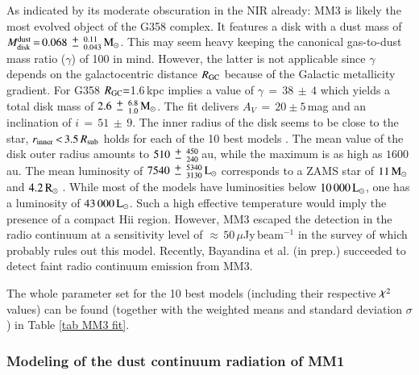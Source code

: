As indicated by its moderate obscuration in the NIR
already: MM3 is likely the most evolved object of the G358 complex. 
It features a 
disk with a dust mass of $M_{\rm disk}^{\rm dust}\,{=}\,0.068\,{\mypm}\,_{0.043}^{0.11} \,{\rm M}_\odot$. This may seem heavy keeping the canonical gas-to-dust mass ratio ($\gamma$) of 100 in mind. However, the latter is not applicable since $\gamma$ depends on the galactocentric distance $R_{\rm GC}$ \citep[Eq. 2,]{2017A&A...606L..12G} because of the Galactic metallicity gradient. For G358 $R_{\rm GC}{=}$1.6\,kpc implies a value of $\gamma\,{=}\,38\,{\pm}\,4$ which yields a total disk mass of $2.6\,{\mypm}\,_{1.0}^{6.8}\,{\rm M}_\odot$.
The fit delivers $A_V\,{=}\,20\pm 5\,$mag and an inclination of $i\,{=}\,51\,{\pm}\,9$\degr. The inner radius of the disk seems to be close to the star, 
$r_{\rm inner}\,{<}\,3.5\,R_{\rm sub}$ holds for each of the 10 best models
. The mean value of the disk outer radius amounts to $510\,{\mypm}\,_{240}^{450}\,$au, while the maximum is as high as  $1600\,$au.
The mean luminosity of $7540\,{\mypm}\,_{3130}^{5340}\,{\rm L}_\odot$ corresponds to a ZAMS star of $11\,{\rm M}_\odot$ and $4.2\,{\rm R}_\odot$ \citep{1996MNRAS.281..257T}. While most of the models have luminosities below $10\,000\,{\rm L}_\odot$, one has a luminosity of $43\,000\,{\rm L}_\odot$. Such a high effective temperature would imply the presence of a compact H{\sc ii} region. However, MM3 escaped the detection in the radio continuum at a sensitivity level of ${\approx}\,50\,\mu$Jy\,beam$^{-1}$
in the survey of
\citet{2016ApJ...833...18H} which probably rules out this model. Recently, Bayandina et al. (in prep.) succeeded to detect faint radio continuum emission from MM3.

The whole parameter set for the 10 best models (including their respective $\goodchi^2$ values) can be found (together with the weighted means and standard deviation $\sigma$) in Table \ref{tab MM3 fit}.

\subsubsection{Modeling of the dust continuum radiation of MM1}\label{drt1}

